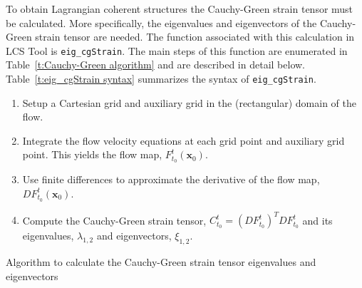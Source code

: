 \documentclass{article}
\begin{document}
To obtain Lagrangian coherent structures the Cauchy-Green strain tensor must be calculated. More specifically, the eigenvalues and eigenvectors of the Cauchy-Green strain tensor are needed. The function associated with this calculation in LCS Tool is \lstinline!eig_cgStrain!. The main steps of this function are enumerated in Table~\ref{t:Cauchy-Green algorithm} and are described in detail below. Table~\ref{t:eig_cgStrain syntax} summarizes the syntax of \lstinline!eig_cgStrain!.

\begin{table}
\begin{enumerate}
\item Setup a Cartesian grid and auxiliary grid in the (rectangular) domain of the flow.
\item Integrate the flow velocity equations at each grid point and auxiliary grid point. This yields the flow map, $F_{t_0}^t(\boldsymbol x_0)$.
\item Use finite differences to approximate the derivative of the flow map, $D F_{t_0}^t(\boldsymbol x_0)$.
\item Compute the Cauchy-Green strain tensor, $C_{t_0}^t = \left(D F_{t_0}^t\right)^T D F_{t_0}^t$ and its eigenvalues, $\lambda_{1,2}$ and eigenvectors, $\xi_{1,2}$.
\end{enumerate}
\caption{Algorithm to calculate the Cauchy-Green strain tensor eigenvalues and eigenvectors}
\label{t:Cauchy-Green algorithm}
\end{table}
\end{document}
